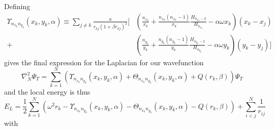 \documentclass[a4paper, hidelinks, 10pt]{article}\usepackage[utf8]{inputenc}
\newcommand{\suml}[2]{\sum\limits_{#1=1}^{#2}}
\begin{document}
    Defining
        \begin{equation}
            \begin{aligned}
                \Upsilon_{n_{x_k}n_{y_k}}(x_k,y_k,\alpha) \equiv \sum_{j\neq k}
                \frac{a}{r_{kj}\left(1+\beta r_{kj}\right)^2}
                \Bigg[&\left(\frac{n_{x_k}}{x_k} +
                \frac{n_{x_k}(n_{x_k}-1)}{x_k}\frac{H_{n_{x_k}-2}}{H_{n_{x_k}}}
                - \alpha\omega x_k\right)\left(x_k-x_j\right) \\
                + &\left(\frac{n_{y_k}}{y_k} +
                \frac{n_{y_k}(n_{y_k}-1)}{y_k}\frac{H_{n_{y_k}-2}}{H_{n_{y_k}}}
                - \alpha\omega y_k\right)\left(y_k-y_j\right) \Bigg]
            \end{aligned}
            \label{eq:upsilondef}
        \end{equation}
    gives the final expression for the Laplacian for our wavefunction
        \begin{equation}
            \nabla^2_N\Psi_T = \suml{k}{N}
            \left(\Upsilon_{n_{x_k}n_{y_k}}(x_k,y_k,\alpha) +
            \Theta_{n_{x_k}n_{y_k}}(x_k,y_k,\alpha) +
            Q\left(r_k,\beta\right)\right)\Psi_T
            \label{eq:lapNfin}
        \end{equation}
    and the local energy is thus
        \begin{equation}
            E_L = \frac{1}{2}\suml{k}{N} \left(\omega^2r_k -
            \Upsilon_{n_{x_k}n_{y_k}}(x_k,y_k,\alpha) -
            \Theta_{n_{x_k}n_{y_k}}(x_k,y_k,\alpha) -
            Q\left(r_k,\beta\right)\right) + \sum^N_{i<j} \frac{1}{r_{ij}}
            \label{eq:ELNfin}
        \end{equation}
    with
\end{document}
